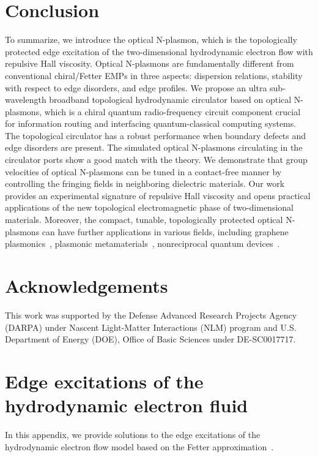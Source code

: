 \documentclass[%
reprint,
amsmath,amssymb,
aps,superscriptaddress
]{revtex4-2}
\begin{document}
\section{Conclusion}\label{section5}
To summarize, we introduce the optical N-plasmon, which is the topologically protected edge excitation of the two-dimensional hydrodynamic electron flow with repulsive Hall viscosity. Optical N-plasmons are fundamentally different from conventional chiral/Fetter EMPs in three aspects: dispersion relations, stability with respect to edge disorders, and edge profiles. We propose an ultra sub-wavelength broadband topological hydrodynamic circulator based on optical N-plasmons, which is a chiral quantum radio-frequency circuit component crucial for information routing and interfacing quantum-classical computing systems. The topological circulator has a robust performance when boundary defects and edge disorders are present. The simulated optical N-plasmons circulating in the circulator ports show a good match with the theory. We demonstrate that group velocities of optical N-plasmons can be tuned in a contact-free manner by controlling the fringing fields in neighboring dielectric materials. Our work provides an experimental signature of repulsive Hall viscosity and opens practical applications of the new topological electromagnetic phase of two-dimensional materials. Moreover, the compact, tunable, topologically protected optical N-plasmons can have further applications in various fields, including graphene plasmonics~\cite{grigorenko2012graphene,koppens2011graphene,chen2012optical,jablan2013plasmons,jablan2009plasmonics,garcia2014graphene}, plasmonic metamaterials~\cite{monticone2017metamaterial}, nonreciprocal quantum devices~\cite{viola2014hall,bosco2017self}.

\section{Acknowledgements}
	This work was supported by the Defense Advanced Research Projects Agency (DARPA) under Nascent Light-Matter Interactions (NLM) program and U.S. Department of Energy (DOE), Office of Basic Sciences under DE-SC0017717.
 
\appendix

\section{Edge excitations of the hydrodynamic electron fluid}\label{appendixA}
In this appendix, we provide solutions to the edge excitations of the hydrodynamic electron flow model based on the Fetter approximation~\cite{fetter1985edge}.
\end{document}
